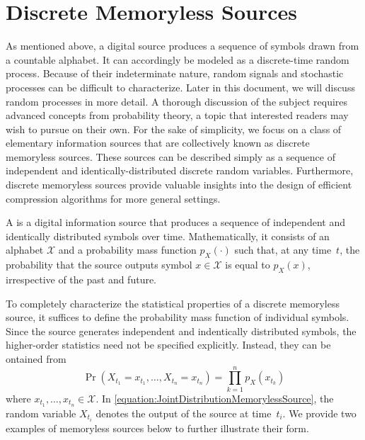 \section{Discrete Memoryless Sources}

As mentioned above, a digital source produces a sequence of symbols drawn from a countable alphabet.
It can accordingly be modeled as a discrete-time random process.
Because of their indeterminate nature, random signals and stochastic processes can be difficult to characterize.
Later in this document, we will discuss random processes in more detail.
A thorough discussion of the subject requires advanced concepts from probability theory, a topic that interested readers may wish to pursue on their own.
For the sake of simplicity, we focus on a class of elementary information sources that are collectively known as discrete memoryless sources.
These sources can be described simply as a sequence of independent and identically-distributed discrete random variables.
Furthermore, discrete memoryless sources provide valuable insights into the design of efficient compression algorithms for more general settings.

\begin{definition}
A  is a digital information source that produces a sequence of independent and identically distributed symbols over time.
Mathematically, it consists of an alphabet $\mathcal{X}$ and a probability mass function $p_X(\cdot)$ such that, at any time~$t$, the probability that the source outputs symbol $x \in \mathcal{X}$ is equal to $p_X(x)$, irrespective of the past and future.
\end{definition}

To completely characterize the statistical properties of a discrete memoryless source, it suffices to define the probability mass function of individual symbols.
Since the source generates independent and indentically distributed symbols, the higher-order statistics need not be specified explicitly.
Instead, they can be ontained from
\begin{equation} \label{equation:JointDistributionMemorylessSource}
\Pr (X_{t_1} = x_{t_1}, \ldots, X_{t_n} = x_{t_n})
= \prod_{k = 1}^n p_X(x_{t_k})
\end{equation}
where $x_{t_1}, \ldots, x_{t_n} \in \mathcal{X}$.
In \eqref{equation:JointDistributionMemorylessSource}, the random variable $X_{t_i}$ denotes the output of the source at time~$t_i$.
We provide two examples of memoryless sources below to further illustrate their form.

